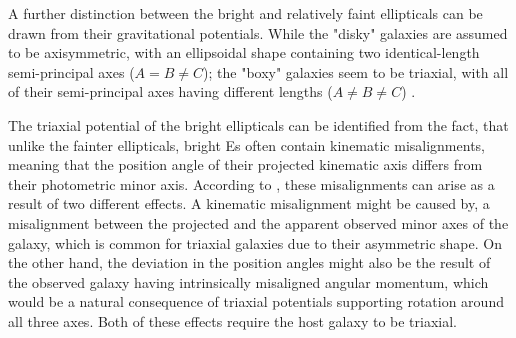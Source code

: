 \documentclass[english, twoside]{HYgradu}
\begin{document}
A further distinction between the bright and relatively faint ellipticals can be drawn from their gravitational potentials. While the "disky" galaxies are assumed to be axisymmetric, with an ellipsoidal shape containing two identical-length semi-principal axes ($A = B \neq C$); the "boxy" galaxies seem to be triaxial, with all of their semi-principal axes having different lengths ($A \neq B \neq C$) \citep{GalaxyFormationAndEvo2010}. 

The triaxial potential of the bright ellipticals can be identified from the fact, that unlike the fainter ellipticals, bright Es often contain kinematic misalignments, meaning that the position angle of their projected kinematic axis differs from their photometric minor axis. According to \cite{GalaxyFormationAndEvo2010}, these misalignments can arise as a result of two different effects. A kinematic misalignment might be caused by, a misalignment between the projected and the apparent observed minor axes of the galaxy, which is common for triaxial galaxies due to their asymmetric shape. On the other hand, the deviation in the position angles might also be the result of the observed galaxy having intrinsically misaligned angular momentum, which would be a natural consequence of triaxial potentials supporting rotation around all three axes. Both of these effects require the host galaxy to be triaxial.
\end{document}
